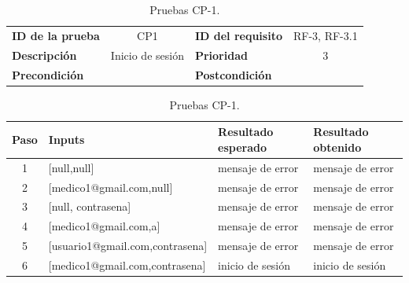 \begin{table}[htbp]
    \centering
    \begin{tabular}{|lc|lc|}
    \toprule
        \textbf{ID de la prueba} & CP1 & \textbf{ID del requisito} & RF-3, RF-3.1 \\
        \textbf{Descripción} & Inicio de sesión & \textbf{Prioridad} & 3 \\

        \textbf{Precondición} &   & \textbf{Postcondición} &   \\
        \bottomrule
    \end{tabular}

    \centering
    \begin{tabular}{clll}
    \toprule
    Paso & Inputs & Resultado esperado & Resultado obtenido  \\
    \midrule
    
    1 & [null,null] & mensaje de error & mensaje de error  \\
    2 & [medico1@gmail.com,null] & mensaje de error & mensaje de error  \\
    3 &[null, contrasena] & mensaje de error & mensaje de error  \\
    4 & [medico1@gmail.com,a] & mensaje de error & mensaje de error \\
    5 & [usuario1@gmail.com,contrasena] & mensaje de error & mensaje de error  \\
    6  & [medico1@gmail.com,contrasena] & inicio de sesión & inicio de sesión  \\
    
    
    \bottomrule
    \end{tabular}
\caption{Pruebas CP-1.}
\label{Pruebas CP-1}
\end{table}


